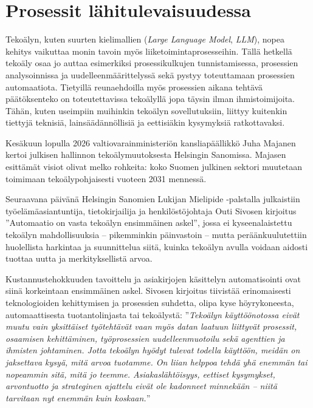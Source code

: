 \documentclass[
  finnish,
  letterpaper,
  DIV=11,
  numbers=noendperiod,
  oneside]{scrreprt}
\begin{document}
\section{Prosessit
lähitulevaisuudessa}\label{prosessit-luxe4hitulevaisuudessa}

Tekoälyn, kuten suurten kielimallien (\emph{Large Language Model},
\emph{LLM}), nopea kehitys vaikuttaa monin tavoin myös
liiketoimintaprosesseihin. Tällä hetkellä tekoäly osaa jo auttaa
esimerkiksi prosessikulkujen tunnistamisessa, prosessien analysoinnissa
ja uudelleenmäärittelyssä sekä pystyy toteuttamaan prosessien
automaatiota. Tietyillä reunaehdoilla myös prosessien aikana tehtävä
päätöksenteko on toteutettavissa tekoälyllä jopa täysin ilman
ihmistoimijoita. Tähän, kuten useimpiin muihinkin tekoälyn
sovellutuksiin, liittyy kuitenkin tiettyjä teknisiä, lainsäädännöllisiä
ja eettisiäkin kysymyksiä ratkottavaksi.

Kesäkuun lopulla 2026 valtiovarainministeriön kansliapäällikkö Juha
Majanen kertoi julkisen hallinnon tekoälymuutoksesta Helsingin
Sanomissa. Majasen esittämät visiot olivat melko rohkeita: koko Suomen
julkinen sektori muutetaan toimimaan tekoälypohjaisesti vuoteen 2031
mennessä.

Seuraavana päivänä Helsingin Sanomien Lukijan Mielipide -palstalla
julkaistiin työelämäasiantuntija, tietokirjailija ja henkilöstöjohtaja
Outi Sivosen kirjoitus ''Automaatio on
vasta tekoälyn ensimmäinen askel'', jossa ei kyseenalaistettu tekoälyn
mahdollisuuksia -- pikemminkin päinvastoin -- mutta peräänkuulutettiin
huolellista harkintaa ja suunnittelua siitä, kuinka tekoälyn avulla
voidaan aidosti tuottaa uutta ja merkityksellistä arvoa.

Kustannustehokkuuden tavoittelu ja asiakirjojen käsittelyn
automatisointi ovat siinä korkeintaan ensimmäinen askel. Sivosen
kirjoitus tiivistää erinomaisesti teknologioiden kehittymisen ja
prosessien suhdetta, olipa kyse höyrykoneesta, automaattisesta
tuotantolinjasta tai tekoälystä: ''\emph{Tekoälyn käyttöönotossa eivät
muutu vain yksittäiset työtehtävät vaan myös datan laatuun liittyvät
prosessit, osaamisen kehittäminen, työprosessien uudelleenmuotoilu sekä
agenttien ja ihmisten johtaminen. Jotta tekoälyn hyödyt tulevat todella
käyttöön, meidän on jaksettava kysyä, mitä arvoa tuotamme. On liian
helppoa tehdä yhä enemmän tai nopeammin sitä, mitä jo teemme.
Asiakaslähtöisyys, eettiset kysymykset, arvontuotto ja strateginen
ajattelu eivät ole kadonneet minnekään -- niitä tarvitaan nyt enemmän
kuin koskaan.}''
\end{document}
